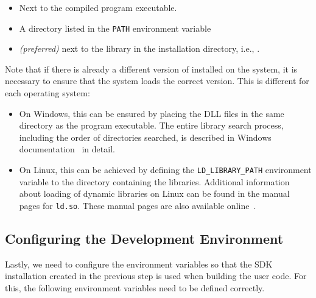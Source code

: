 \begin{itemize}

  \item Next to the compiled program executable.

  \item A directory listed in the \texttt{PATH} environment variable

  \item \textit{(preferred)} next to the \SystemNetQuicDll{} library in the \dotnet{} installation
directory, i.e., .

\end{itemize}

Note that if there is already a different version of \libopenssl{} installed on the system, it is
necessary to ensure that the system loads the correct \libopenssl{} version. This is different for
each operating system:

\begin{itemize}

  \item On Windows, this can be ensured by placing the DLL files in the same directory as the
program executable. The entire library search process, including the order of directories searched,
is described in Windows documentation~\cite{windowsDllSearch} in detail.

  \item On Linux, this can be achieved by defining the \texttt{LD_LIBRARY_PATH} environment variable
to the directory containing the \libopenssl{} libraries. Additional information about loading of
dynamic libraries on Linux can be found in the manual pages for \texttt{ld.so}. These manual pages
are also available online~\cite{linuxDllSearch}.

\end{itemize}

\subsection{Configuring the Development Environment}\label{sec:06-env-vars}

Lastly, we need to configure the environment variables so that the \dotnet{} SDK installation
created in the previous step is used when building the user code. For this, the following
environment variables need to be defined correctly.

